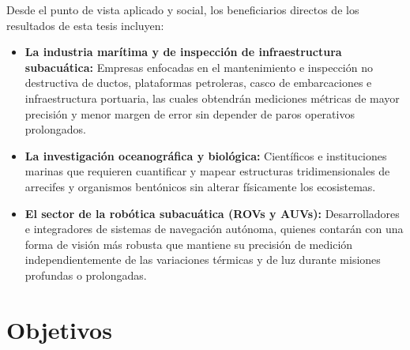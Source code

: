 \documentclass[12pt,letterpaper,spanish,twoside,openright]{report}
\begin{document}
Desde el punto de vista aplicado y social, los beneficiarios directos de los resultados de esta tesis incluyen:

\begin{itemize}[noitemsep]
    \item \textbf{La industria marítima y de inspección de infraestructura subacuática:} Empresas enfocadas en el mantenimiento e inspección no destructiva de ductos, plataformas petroleras, casco de embarcaciones e infraestructura portuaria, las cuales obtendrán mediciones métricas de mayor precisión y menor margen de error sin depender de paros operativos prolongados.
    \item \textbf{La investigación oceanográfica y biológica:} Científicos e instituciones marinas que requieren cuantificar y mapear estructuras tridimensionales de arrecifes y organismos bentónicos sin alterar físicamente los ecosistemas.
    \item \textbf{El sector de la robótica subacuática (ROVs y AUVs):} Desarrolladores e integradores de sistemas de navegación autónoma, quienes contarán con una forma de visión más robusta que mantiene su precisión de medición independientemente de las variaciones térmicas y de luz durante misiones profundas o prolongadas.
\end{itemize}


\section{Objetivos}

\end{document}
